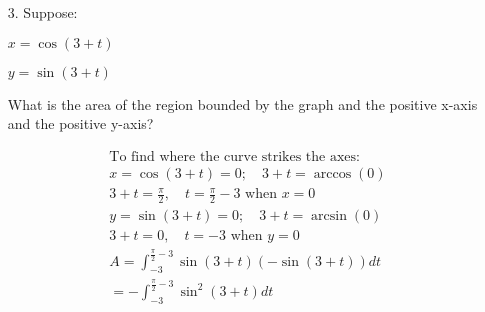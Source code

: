 \begin{itemize}
        \item [3.] Suppose:
        
        $x=\cos(3+t)$

        $y=\sin(3+t)$

        What is the area of the region bounded by the graph and the positive x-axis and the positive y-axis?
        \\
        \begin{mdframed}
            \begin{multicols}{2}
                \hfill
                \begin{center}
                \end{center}
                \hfill
                
                \columnbreak

                \begin{equation*}
                    \begin{gathered}
                        \text{To find where the curve strikes the axes: }       \\
                        x = \cos(3+t) = 0; \quad 3+t = \arccos(0)               \\
                        3 + t = \frac{\pi}{2}, \quad 
                        t = \frac{\pi}{2} - 3 \text{ when } x = 0               \\
                        y = \sin(3+t) = 0; \quad 3 + t = \arcsin(0)             \\
                        3 + t = 0, \quad 
                        t = -3 \text{ when } y = 0                              \\
                        A = \int_{-3}^{\frac{\pi}{2}-3}\sin(3+t)(-\sin(3+t))dt  \\
                        = -\int_{-3}^{\frac{\pi}{2}-3}\sin^{2}(3+t)dt
                    \end{gathered}
                \end{equation*}
            \end{multicols}


\end{mdframed}
\end{itemize}
